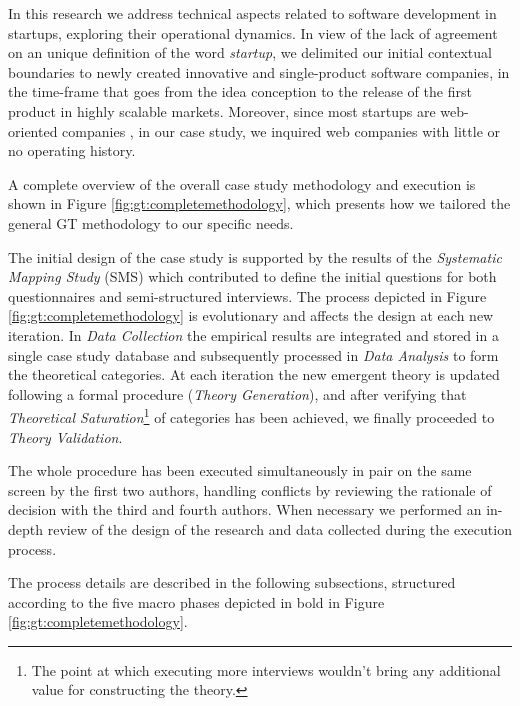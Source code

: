 \documentclass[10pt,journal,letterpaper,compsoc]{IEEEtran}
\begin{document}
In this research we address technical aspects related to software development 
in startups, exploring their operational dynamics. In view of the lack of 
agreement on an unique definition of the word \textit{startup}, we delimited our 
initial contextual boundaries to newly created innovative and single-product 
software companies, in the time-frame that goes from the idea conception to the 
release of the first product in highly scalable markets. Moreover, since most 
startups are web-oriented companies \cite{tc-webstartups-link, Allen2003}, in 
our case study, we inquired web companies with little or no operating history.

A complete overview of the overall case study methodology and execution is 
shown in Figure \ref{fig:gt:completemethodology}, which presents how we tailored 
the general GT methodology to our specific needs.


The initial design of the case study is supported by the results of the 
\textit{Systematic Mapping Study} (SMS) \cite{SMS} which contributed to define 
the initial questions for both questionnaires and semi-structured interviews. 
The process depicted in Figure \ref{fig:gt:completemethodology} is evolutionary 
and affects the design at each new iteration. In \textit{Data Collection} the 
empirical results are integrated and stored in a single case study database and 
subsequently processed in \textit{Data Analysis} to form the theoretical 
categories.  At each iteration the new emergent theory is updated following a 
formal procedure (\textit{Theory Generation}), and after verifying that 
\textit{Theoretical Saturation}\footnote{The point at which executing more 
interviews wouldn't bring any additional value for constructing the theory.} of 
categories has been achieved, we finally proceeded to \textit{Theory 
Validation}. 

The whole procedure has been executed simultaneously in pair on the same screen 
by the first two authors, handling conflicts by reviewing the rationale of 
decision with the third and fourth authors. When necessary we performed an 
in-depth review of the design of the research and data collected during the 
execution process. 

The process details are described in the following subsections, structured 
according to the five macro phases depicted in bold in Figure 
\ref{fig:gt:completemethodology}.



\end{document}
